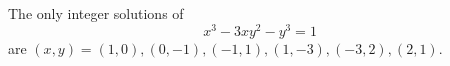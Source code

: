\begin{proposition}\label{eq:052}
    The only integer solutions of
\[
    x^3-3xy^2-y^3=1
\]
    are $(x,y)=(1,0),(0,-1),(-1,1),(1,-3),(-3,2),(2,1)$.
\end{proposition}
